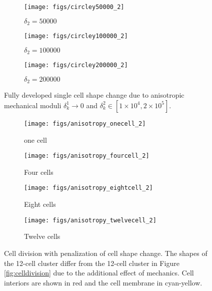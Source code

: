 \documentclass{article}
\begin{document}
\begin{figure}[h!]
	\centering
	\begin{subfigure}[h!]{0.45\textwidth}
		\texttt{[image: figs/circley50000\_2]}
		\caption{$\delta_2 = 50000$}
		\label{fig:delta50000}
	\end{subfigure}
	\begin{subfigure}[h!]{0.45\textwidth}
		\texttt{[image: figs/circley100000\_2]}
		\caption{$\delta_2 = 100000$}
		\label{fig:delta100000}
	\end{subfigure}
	\begin{subfigure}[h!]{0.45\textwidth}
		\texttt{[image: figs/circley200000\_2]}
		\caption{$\delta_2 = 200000$}
		\label{fig:delta200000}
	\end{subfigure}
	\caption{Fully developed single cell shape change due to anisotropic mechanical moduli $\delta^1_k \to 0$ and $\delta^2_k \in [1\times 10^4, 2\times 10^5]$.}
	\label{fig:penalization}
\end{figure}

\begin{figure}[h!]
	\centering
	\begin{subfigure}[h!]{0.45\textwidth}
		\texttt{[image: figs/anisotropy\_onecell\_2]}
		\caption{one cell}
		\label{fig:anisotropy_onecell}
	\end{subfigure}
	\begin{subfigure}[h!]{0.45\textwidth}
		\texttt{[image: figs/anisotropy\_fourcell\_2]}
		\caption{Four cells}
		\label{fig:anisotropy_fourcell}
	\end{subfigure}
	\begin{subfigure}[h!]{0.45\textwidth}
		\texttt{[image: figs/anisotropy\_eightcell\_2]}
		\caption{Eight cells}
		\label{fig:anisotropy_eightcell}
	\end{subfigure}
	\begin{subfigure}[h!]{0.45\textwidth}
		\texttt{[image: figs/anisotropy\_twelvecell\_2]}
		\caption{Twelve cells}
		\label{fig:anisotropy_twelvecell}
	\end{subfigure}
	\caption{Cell division with penalization of cell shape change. The shapes of the 12-cell cluster differ from the 12-cell cluster in Figure \ref{fig:celldivision} due to the additional effect of mechanics. Cell interiors are shown in red and the cell membrane in cyan-yellow.}
	\label{fig:anisotropy_division}
\end{figure}
\end{document}
